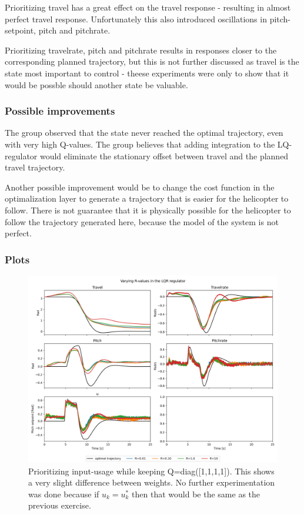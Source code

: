 \documentclass[../main.tex]{subfiles}
\begin{document}
Prioritizing travel has a great effect on the travel response - resulting in almost perfect travel response. Unfortunately this also introduced oscillations in pitch-setpoint, pitch and pitchrate.

Prioritizing travelrate, pitch and pitchrate results in responses closer to the corresponding planned trajectory, but this is not further discussed as travel is the state most important to control - theese experiments were only to show that it would be possble should another state be valuable.

\subsubsection{Possible improvements}
The group observed that the state never reached the optimal trajectory, even with very high Q-values. The group believes that adding integration to the LQ-regulator would eliminate the stationary offset between travel and the planned travel trajectory.

Another possible improvement would be to change the cost function in the optimalization layer to generate a trajectory that is easier for the helicopter to follow. There is not guarantee that it is physically possible for the helicopter to follow the trajectory generated here, because the model of the system is not perfect.

\subsubsection{Plots}

\begin{figure}[h]
	\centering
    \includegraphics[width=0.8\linewidth]{figures/LAB3_R_variations.png}
	\caption{Prioritizing input-usage while keeping Q=diag([1,1,1,1]). This shows a very slight difference between weights. No further experimentation was done because if $u_k = u_k^*$ then that would be the same as the previous exercise.}
	\label{fig:LAB3_R_variations}
\end{figure}
\end{document}
